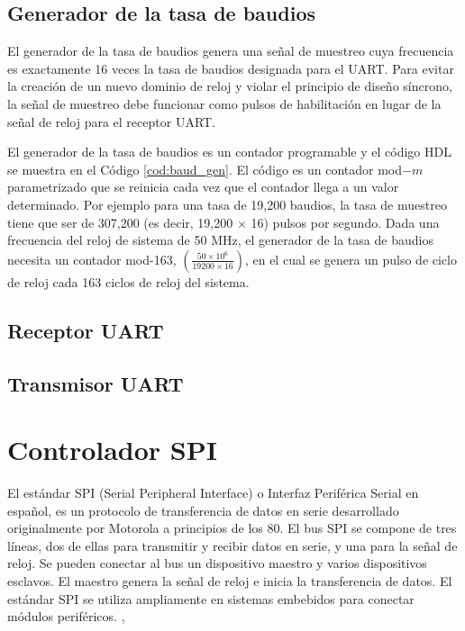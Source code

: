     \subsection{Generador de la tasa de baudios}

    El generador de la tasa de baudios genera una señal de muestreo cuya frecuencia es exactamente 16 veces la tasa de baudios designada para el UART. Para evitar la creación de un nuevo dominio de reloj y violar el principio de diseño síncrono, la señal de muestreo debe funcionar como pulsos de habilitación en lugar de la señal de reloj para el receptor UART.

    El generador de la tasa de baudios es un contador programable y el código HDL se muestra en el Código \ref{cod:baud_gen}. El código es un contador mod$-m$ parametrizado que se reinicia cada vez que el contador llega a un valor determinado. Por ejemplo para una tasa de 19,200 baudios, la tasa de muestreo tiene que ser de 307,200 (es decir, 19,200 $\times$ 16) pulsos por segundo. Dada una frecuencia del reloj de sistema de 50 MHz, el generador de la tasa de baudios necesita un contador mod-163, $\left( \frac{50 \times 10^{6}}{19200 \times 16} \right)$, en el cual se genera un pulso de ciclo de reloj cada 163 ciclos de reloj del sistema.

    \subsection{Receptor UART}

    \subsection{Transmisor UART}

	\section{Controlador SPI}

    El estándar SPI (Serial Peripheral Interface) o Interfaz Periférica Serial en español, es un protocolo de transferencia de datos en serie desarrollado originalmente por Motorola a principios de los 80. El bus SPI se compone de tres líneas, dos de ellas para transmitir y recibir datos en serie, y una para la señal de reloj. Se pueden conectar al bus un dispositivo maestro y varios dispositivos esclavos. El maestro genera la señal de reloj e inicia la transferencia de datos. El estándar SPI se utiliza ampliamente en sistemas embebidos para conectar módulos periféricos. \cite{Chu2018}, \cite{Chu2008}

